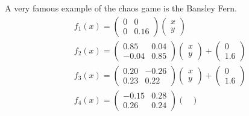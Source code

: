\documentclass[../stationary_ifs.tex]{subfiles}
\begin{document}
\begin{example}
	A very famous example of the chaos game is the Bansley Fern.
	\begin{align*}
		 & f_1(x) = \begin{pmatrix}
			            0 & 0    \\
			            0 & 0.16
		            \end{pmatrix}\begin{pmatrix}
			                         x \\
			                         y
		                         \end{pmatrix}                 \\
		 & f_2(x) = \begin{pmatrix}
			            0.85  & 0.04 \\
			            -0.04 & 0.85
		            \end{pmatrix}\begin{pmatrix}
			                         x \\
			                         y
		                         \end{pmatrix} + \begin{pmatrix}
			                                         0 \\
			                                         1.6
		                                         \end{pmatrix} \\
		 & f_3(x) = \begin{pmatrix}
			            0.20 & -0.26 \\
			            0.23 & 0.22
		            \end{pmatrix}\begin{pmatrix}
			                         x \\
			                         y
		                         \end{pmatrix} + \begin{pmatrix}
			                                         0 \\
			                                         1.6
		                                         \end{pmatrix} \\
		 & f_4(x) = \begin{pmatrix}
			            -0.15 & 0.28 \\
			            0.26  & 0.24
		            \end{pmatrix}\begin{pmatrix}

\end{pmatrix}
\end{align*}
\end{example}
\end{document}
